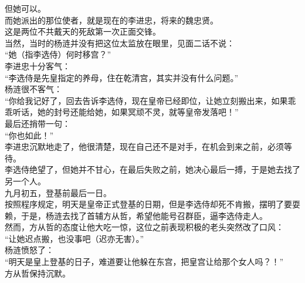 \begin{multicols}{\theparacolNo}
但她可以。\\

而她派出的那位使者，就是现在的李进忠，将来的魏忠贤。\\

这是两位不共戴天的死敌第一次正面交锋。\\

当然，当时的杨涟并没有把这位太监放在眼里，见面二话不说：\\

“她（指李选侍）何时移宫？”\\

李进忠十分客气：\\

“李选侍是先皇指定的养母，住在乾清宫，其实并没有什么问题。”\\

杨涟很不客气：\\

“你给我记好了，回去告诉李选侍，现在皇帝已经即位，让她立刻搬出来，如果乖乖听话，她的封号还能给她，如果冥顽不灵，就等皇帝发落吧！”\\

最后还捎带一句：\\

“你也如此！”\\

李进忠沉默地走了，他很清楚，现在自己还不是对手，在机会到来之前，必须等待。\\

李选侍绝望了，但她并不甘心，在最后失败之前，她决心最后一搏，于是她去找了另一个人。\\

九月初五，登基前最后一日。\\

按照程序规定，明天是皇帝正式登基的日期，但是李选侍却死不肯搬，摆明了要耍赖，于是，杨涟去找了首辅方从哲，希望他能号召群臣，逼李选侍走人。\\

然而，方从哲的态度让他大吃一惊，这位之前表现积极的老头突然改了口风：\\

“让她迟点搬，也没事吧（迟亦无害）。”\\

杨涟愤怒了：\\

“明天是皇上登基的日子，难道要让他躲在东宫，把皇宫让给那个女人吗？！”\\

方从哲保持沉默。\\


\end{multicols}
